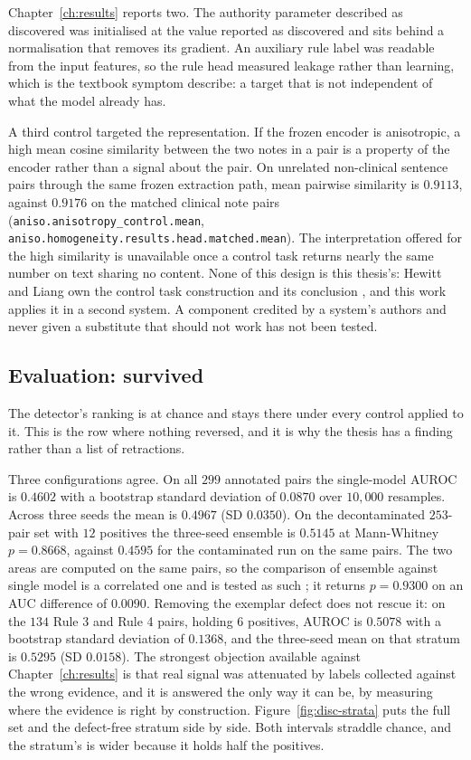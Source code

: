 Chapter~\ref{ch:results} reports two. The authority parameter described as
discovered was initialised at the value reported as discovered and sits behind a
normalisation that removes its gradient. An auxiliary rule label was readable
from the input features, so the rule head measured leakage rather than learning,
which is the textbook symptom \citet{kaufman2012leakage} describe: a target that
is not independent of what the model already has.

A third control targeted the representation. If the frozen encoder is
anisotropic, a high mean cosine similarity between the two notes in a pair is a
property of the encoder rather than a signal about the pair. On unrelated
non-clinical sentence pairs through the same frozen extraction path, mean
pairwise similarity is $0.9113$, against $0.9176$ on the matched clinical note
pairs (\texttt{aniso.anisotropy\_control.mean},
\texttt{aniso.homogeneity.results.head.matched.mean}). The interpretation
offered for the high similarity is unavailable once a control task returns nearly
the same number on text sharing no content. None of this design is this thesis's:
Hewitt and Liang own the control task construction and its conclusion
\citep{hewitt2019control}, and this
work applies it in a second system. A component credited by a system's authors and
never given a substitute that should not work has not been tested.

\subsection{Evaluation: survived}

The detector's ranking is at chance and stays there under every control applied
to it. This is the row where nothing reversed, and it is why the thesis has a
finding rather than a list of retractions.

Three configurations agree. On all $299$ annotated pairs the single-model AUROC is
$0.4602$ with a bootstrap standard deviation of $0.0870$ over $10{,}000$
resamples. Across three seeds the mean is $0.4967$ (SD $0.0350$). On the
decontaminated $253$-pair set with $12$ positives the three-seed ensemble is
$0.5145$ at Mann-Whitney $p = 0.8668$, against $0.4595$ for the contaminated run
on the same pairs. The two areas are computed on the same pairs, so the
comparison of ensemble against single model is a correlated one and is tested as
such \citep{delong1988comparing}; it returns $p = 0.9300$ on an AUC difference of
$0.0090$. Removing the exemplar defect does
not rescue it: on the $134$ Rule 3 and Rule 4 pairs, holding $6$ positives, AUROC
is $0.5078$ with a bootstrap standard deviation of $0.1368$, and the three-seed
mean on that stratum is $0.5295$ (SD $0.0158$). The strongest objection available
against Chapter~\ref{ch:results} is that real signal was attenuated by labels
collected against the wrong evidence, and it is answered the only way it can be,
by measuring where the evidence is right by construction.
Figure~\ref{fig:disc-strata} puts the full set and the defect-free stratum side
by side. Both intervals straddle chance, and the stratum's is wider because it
holds half the positives.

